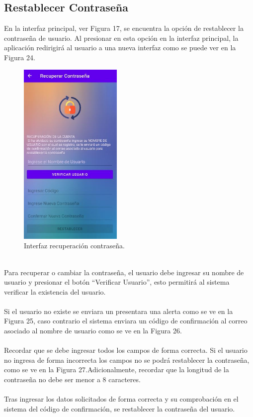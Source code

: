\documentclass[a4paper,10pt, oneside, titlepage]{article}
\begin{document}
	\subsection{Restablecer Contraseña}
	En la interfaz principal, ver Figura 17, se encuentra la opción de restablecer la contraseña de usuario. Al presionar en esta opción en la interfaz principal, la aplicación redirigirá al usuario a una nueva interfaz como se puede ver en la Figura 24.
	\begin{figure}[!ht]
		\centering
		\includegraphics[width = .4\linewidth, height = 9cm]{24.jpg}
		\caption{Interfaz recuperación contraseña.}
	\end{figure}\\
	Para recuperar o cambiar la contraseña, el usuario debe ingresar su nombre de usuario y presionar el botón ``Verificar Usuario'', esto permitirá al sistema verificar la existencia del usuario.\\\\
	Si el usuario no existe se enviara un presentara una alerta como se ve en la Figura 25, caso contrario el sistema enviara un código de confirmación al correo asociado al nombre de usuario como se ve en la Figura 26.\\\\
	Recordar que se debe ingresar todos los campos de forma correcta. Si el usuario no ingresa de forma incorrecta los campos no se podrá restablecer la contraseña, como se ve en la Figura 27.Adicionalmente, recordar que la longitud de la contraseña no debe ser menor a 8 caracteres.\\\\
	Tras ingresar los datos solicitados de forma correcta y su comprobación en el sistema del código de confirmación, se restablecer la contraseña del usuario.\\\\
\end{document}

